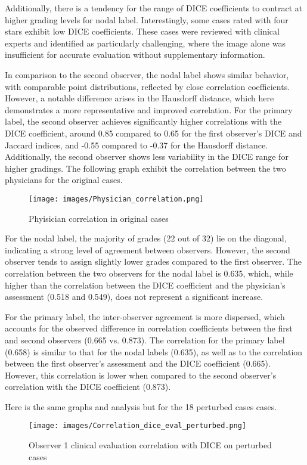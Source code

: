 Additionally, there is a tendency for the range of DICE coefficients to contract at higher grading levels for nodal label. Interestingly, some cases rated with four stars exhibit low DICE coefficients. These cases were reviewed with clinical experts and identified as particularly challenging, where the image alone was insufficient for accurate evaluation without supplementary information.

In comparison to the second observer, the nodal label shows similar behavior, with comparable point distributions, reflected by close correlation coefficients. However, a notable difference arises in the Hausdorff distance, which here demonstrates a more representative and improved correlation. For the primary label, the second observer achieves significantly higher correlations with the DICE coefficient, around 0.85 compared to 0.65 for the first observer's DICE and Jaccard indices, and -0.55 compared to -0.37 for the Hausdorff distance. Additionally, the second observer shows less variability in the DICE range for higher gradings.
\newpage
The following graph exhibit the correlation between the two physicians for the original cases.
\begin{figure}[ht]
    \centering
    \texttt{[image: images/Physician\_correlation.png]}
    \caption{Phyisician correlation in original cases}
    \label{fig:three_subfigures}
\end{figure}

For the nodal label, the majority of grades (22 out of 32) lie on the diagonal, indicating a strong level of agreement between observers. However, the second observer tends to assign slightly lower grades compared to the first observer. The correlation between the two observers for the nodal label is 0.635, which, while higher than the correlation between the DICE coefficient and the physician’s assessment (0.518 and 0.549), does not represent a significant increase.

For the primary label, the inter-observer agreement is more dispersed, which accounts for the observed difference in correlation coefficients between the first and second observers (0.665 vs. 0.873). The correlation for the primary label (0.658) is similar to that for the nodal labels (0.635), as well as to the correlation between the first observer’s assessment and the DICE coefficient (0.665). However, this correlation is lower when compared to the second observer’s correlation with the DICE coefficient (0.873).\newpage  

Here is the same graphs and analysis but for the 18 perturbed cases cases.
\begin{figure}[ht]
    \centering
    \texttt{[image: images/Correlation\_dice\_eval\_perturbed.png]}
    \caption{Observer 1 clinical evaluation correlation with DICE on perturbed cases}
    \label{fig:three_subfigures}
\end{figure}

